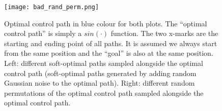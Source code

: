 \documentclass{report}
\numberwithin{equation}{section}
\numberwithin{figure}{section}
\numberwithin{table}{section}
\numberwithin{algorithm}{section}
\begin{document}
\begin{figure}[H]
  \centering
  \texttt{[image: bad\_rand\_perm.png]}
  \caption{\label{fig:bad_rand_perm} Optimal control path 
  in blue colour for both plots. The ``optimal control path'' 
  is simply a $sin(\cdot)$ function. The two x-marks are the 
  starting and ending point of all paths. It is assumed 
  we always start from the same position and the ``goal'' is also 
  at the same position. Left: different soft-optimal 
  paths sampled alongside the optimal control path (soft-optimal 
  paths generated by adding random Gaussian noise to the optimal 
  path). Right: different 
  random permutations of the optimal control path sampled alongside 
  the optimal control path.}
\end{figure}




\end{document}
